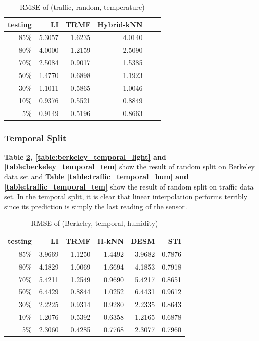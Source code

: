 \begin{table} [htbp]
\centering
\caption{RMSE of (traffic, random, temperature)}
\label{table:traffic_random_tem}
\begin{tabular}{ r | r r r r r}
	testing	&LI	&TRMF	&Hybrid-kNN \\ \hline
	85\%	&5.3057	&1.6235	&4.0140\\ 
	80\%	&4.0000	&1.2159	&2.5090\\
	70\%	&2.5084	&0.9017	&1.5385\\
	50\%	&1.4770	&0.6898	&1.1923\\
	30\%	&1.1011	&0.5865	&1.0046\\
	10\%	&0.9376	&0.5521	&0.8849\\
	 5\%	&0.9149	&0.5196	&0.8663
\end{tabular}
\end{table}

\subsubsection{Temporal Split}
\textbf{Table \ref{table:berkeley_temporal_hum}, \ref{table:berkeley_temporal_light} and \ref{table:berkeley_temporal_tem}} show the result of random split on Berkeley data set and \textbf{Table \ref{table:traffic_temporal_hum} and \ref{table:traffic_temporal_tem}} show the result of random split on traffic data set.
In the temporal split, it is clear that linear interpolation performs terribly since its prediction is simply the last reading of the sensor.

\begin{table}[htbp]
\centering
\caption{RMSE of (Berkeley, temporal, humidity)}
\label{table:berkeley_temporal_hum}
\begin{tabular}{ r | r r r r r}
	testing	&LI	&TRMF	&H-kNN	&DESM	&STI\\ \hline
	85\%	&3.9669	&1.1250	&1.4492	&3.9682	&0.7876\\ 
	80\%	&4.1829	&1.0069	&1.6694	&4.1853	&0.7918\\
	70\%	&5.4211	&1.2549	&0.9690	&5.4217	&0.8651\\
	50\%	&6.4429	&0.8844	&1.0252	&6.4431	&0.9612\\
	30\%	&2.2225	&0.9314	&0.9280	&2.2335	&0.8643\\
	10\%	&1.2076	&0.5392	&0.6358	&1.2165	&0.6878\\
	 5\%	&2.3060	&0.4285	&0.7768	&2.3077	&0.7960
\end{tabular}
\end{table}

